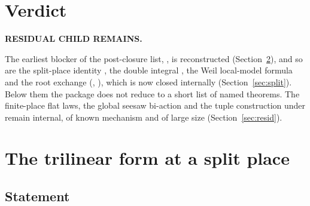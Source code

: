 \documentclass[11pt]{article}
\begin{document}
\section{Verdict}\label{sec:verdict}

\textbf{RESIDUAL CHILD REMAINS.}

The earliest blocker of the post-closure list, , is reconstructed (Section~\ref{sec:tri}), and so are the split-place identity , the double integral , the Weil local-model formula  and the root exchange (, ), which is now closed internally (Section~\ref{sec:split}). Below them the package does not reduce to a short list of named theorems. The finite-place flat laws, the global seesaw bi-action and the tuple construction under  remain internal, of known mechanism and of large size (Section~\ref{sec:resid}).

\section{The trilinear form at a split place}\label{sec:tri}

\subsection{Statement}
\end{document}
